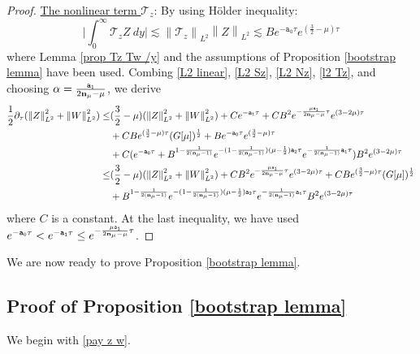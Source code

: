 \documentclass{article}
\newcommand{\norm}[1]{\left\lVert#1\right\rVert}
\newcommand{\al}{\alpha}
\newcommand{\pa}{\partial}
\def\be{\begin{equation}}
\def\ee{\end{equation}}
\def\espz{Z}
\def\espw{W}
\def\nmz{\mathcal T_z}
\def\epone{\mathtt{a_1}}
\def\eptwo{\mathtt{a_2}}
\def\epzero{\mathtt{a_0}}
\def\ndmu{{\bf{n}_{\mu}}}
\numberwithin{equation}{section}
\begin{document}
\begin{proof}
        \noindent\underline{The nonlinear term $\nmz$}:
        By using H\"{o}lder inequality:
        \be\label{l2 Tz}
          \Big|  \int_0^\infty \nmz \espz \ dy\Big|  \lesssim \norm{\nmz}_{L^2} \norm{\espz}_{L^2} \lesssim B e^{-\epzero \tau}e^{(\frac{3}{2}-\mu)\tau} 
        \ee
        where Lemma \ref{prop Tz Tw /y} and the assumptions of Proposition \ref{bootstrap lemma} have been used. Combing \eqref{L2 linear}, \eqref{L2 Sz}, \eqref{L2 Nz}, \eqref{l2 Tz}, and choosing $\al=\frac{\epone}{2\ndmu-\mu}$, we derive
        \begin{align*}
            \frac12\pa_\tau(\norm{\espz}_{L^2}^2 +  \norm{\espw}_{L^2}^2) \leq & (\frac32-\mu) (\norm{\espz}_{L^2}^2 +  \norm{\espw}_{L^2}^2) +Ce^{-\epone \tau}+CB^2 e^{-\frac{\mu\epone}{2\ndmu-\mu}\tau} e^{(3-2\mu)\tau}\\
            &+CBe^{(\frac{3}{2}-\mu)\tau} (G[\mu])^{\frac12}+B e^{-\epzero \tau}e^{(\frac{3}{2}-\mu)\tau}\\
            &+C(e^{-\epzero \tau}+B^{1-\frac{1}{2(\ndmu-1)}} e^{-(1-\frac{1}{2(\ndmu-1)})(\mu-\frac12)\eptwo \tau}e^{-\frac{1}{2(\ndmu-1)}\epone\tau})B^2 e^{(3-2\mu)\tau}\\
            \leq & (\frac32-\mu) (\norm{\espz}_{L^2}^2 +  \norm{\espw}_{L^2}^2) +CB^2 e^{-\frac{\mu\epone}{2\ndmu-\mu}\tau} e^{(3-2\mu)\tau}+CBe^{(\frac{3}{2}-\mu)\tau}(G[\mu])^{\frac12} \\
            &+B^{1-\frac{1}{2(\ndmu-1)}} e^{-(1-\frac{1}{2(\ndmu-1)})(\mu-\frac12)\eptwo \tau}e^{-\frac{1}{2(\ndmu-1)}\epone\tau}B^2 e^{(3-2\mu)\tau}
        \end{align*}
        where $C$ is a constant. At the last inequality, we have used $e^{-\epzero\tau}<e^{-\epone\tau}\leq e^{-\frac{\mu\epone}{2\ndmu-\mu}\tau}$. 
\end{proof}


We are now ready to prove Proposition  \ref{bootstrap lemma}. 

\subsection{Proof of Proposition  \ref{bootstrap lemma}}
        We begin with \eqref{pay z w}. %
        
\end{document}
